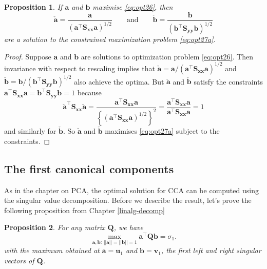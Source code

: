 \documentclass[
]{book}
\newtheorem{proposition}{Proposition}[chapter]
\theoremstyle{definition}
\theoremstyle{definition}
\theoremstyle{definition}
\theoremstyle{definition}
\theoremstyle{remark}
\begin{document}
\begin{proposition}
\protect\hypertarget{prp:unnamed-chunk-1}{}\label{prp:unnamed-chunk-1}If \(\mathbf a\) and \(\mathbf b\) maximise \eqref{eq:opt26}, then
\[
\check{\mathbf a}=\frac{\mathbf a}{(\mathbf a^\top \mathbf S_{\mathbf x\mathbf x}{\mathbf a})^{1/2}} \qquad \text{and} \qquad
\check{\mathbf b}= \frac{{\mathbf b}}{({\mathbf b}^\top \mathbf S_{\mathbf y\mathbf y}{\mathbf b})^{1/2}}
\]
are a solution to the constrained maximization problem \eqref{eq:opt27a}.
\end{proposition}

\begin{proof}
Suppose \({\mathbf a}\) and \({\mathbf b}\) are solutions to optimization problem \eqref{eq:opt26}. Then invariance with respect to rescaling implies that \(\check{\mathbf a}={\mathbf a}/({\mathbf a}^\top \mathbf S_{\mathbf x\mathbf x} {\mathbf a})^{1/2}\) and \(\check{\mathbf b}= {\mathbf b}/({\mathbf b}^\top \mathbf S_{\mathbf y\mathbf y} {\mathbf b})^{1/2}\) also achieve the optima.
But \(\check{\mathbf a}\) and \(\check{\mathbf b}\) satisfy the constraints \(\mathbf a^\top \mathbf S_{\mathbf x\mathbf x}\mathbf a=\mathbf b^\top \mathbf S_{\mathbf y\mathbf y}\mathbf b=1\)
because
\[
\check{\mathbf a}^\top \mathbf S_{\mathbf x\mathbf x} \check{\mathbf a}=\frac{{\mathbf a}^\top \mathbf S_{\mathbf x\mathbf x}{\mathbf a}}{\left \{ \left ({\mathbf a}^\top \mathbf S_{\mathbf x\mathbf x}{\mathbf a}\right )^{1/2}\right \}^2}
=\frac{{\mathbf a}^\top \mathbf S_{\mathbf x\mathbf x}{\mathbf a}}{{\mathbf a}^\top \mathbf S_{\mathbf x\mathbf x}{\mathbf a}}=1
\]
and similarly for \(\check{\mathbf b}\).
So \(\check{\mathbf a}\) and \(\check{\mathbf b}\) maximises \eqref{eq:opt27a} subject to the constraints.
\end{proof}

\hypertarget{the-first-canonical-components}{%
\subsection{The first canonical components}\label{the-first-canonical-components}}

As in the chapter on PCA, the optimal solution for CCA can be computed using the singular value decomposition. Before we describe the result, let's prove the following proposition from Chapter \ref{linalg-decomp}

\begin{proposition}
\protect\hypertarget{prp:svdmax2}{}\label{prp:svdmax2}For any matrix \(\mathbf Q\), we have
\[
\max_{\mathbf a, \mathbf b:\, \vert \vert \mathbf a\vert \vert=\vert \vert \mathbf b\vert \vert =1} \mathbf a^\top \mathbf Q\mathbf b=\sigma_1.
\]
with the maximum obtained at \(\mathbf a=\mathbf u_1\) and \(\mathbf b=\mathbf v_1\), the first left and right singular vectors of \(\mathbf Q\).
\end{proposition}
\end{document}
